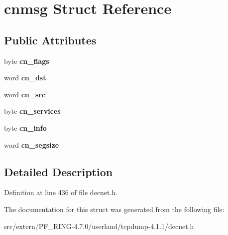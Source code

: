 \hypertarget{structcnmsg}{
\section{cnmsg Struct Reference}
\label{structcnmsg}
}
\subsection*{Public Attributes}
\begin{DoxyCompactItemize}
\item 
\hypertarget{structcnmsg_a8bd4736cfb7a3a32acafedc0203eaad0}{
byte {\bfseries cn\_\-flags}}
\label{structcnmsg_a8bd4736cfb7a3a32acafedc0203eaad0}

\item 
\hypertarget{structcnmsg_aad055f24e2ecbb2b4cdf3a9d4d7d671a}{
word {\bfseries cn\_\-dst}}
\label{structcnmsg_aad055f24e2ecbb2b4cdf3a9d4d7d671a}

\item 
\hypertarget{structcnmsg_a03b6434d0ca193ca39c9dfe2ead1d0fd}{
word {\bfseries cn\_\-src}}
\label{structcnmsg_a03b6434d0ca193ca39c9dfe2ead1d0fd}

\item 
\hypertarget{structcnmsg_a7c30004afc34f67e1a416185ed35c337}{
byte {\bfseries cn\_\-services}}
\label{structcnmsg_a7c30004afc34f67e1a416185ed35c337}

\item 
\hypertarget{structcnmsg_a4994c1c370482edbe7b7e5fa1eb6e5b5}{
byte {\bfseries cn\_\-info}}
\label{structcnmsg_a4994c1c370482edbe7b7e5fa1eb6e5b5}

\item 
\hypertarget{structcnmsg_a13d0fc6d3ff26eec81ae11554d04b739}{
word {\bfseries cn\_\-segsize}}
\label{structcnmsg_a13d0fc6d3ff26eec81ae11554d04b739}

\end{DoxyCompactItemize}


\subsection{Detailed Description}


Definition at line 436 of file decnet.h.



The documentation for this struct was generated from the following file:\begin{DoxyCompactItemize}
\item 
src/extern/PF\_\-RING-\/4.7.0/userland/tcpdump-\/4.1.1/decnet.h\end{DoxyCompactItemize}
